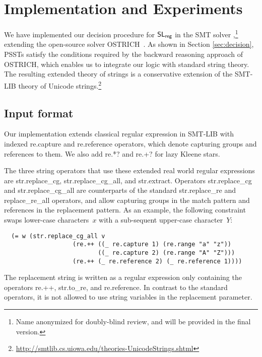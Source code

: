 
\section{Implementation and Experiments}
\label{sect:impl}

We have implemented our decision procedure for $\mathsf{SL}_{\sf reg}$ in the SMT
solver \ostrich,\footnote{Name anonymized for doubly-blind review,
and will be provided in the final version.} extending the
open-source solver OSTRICH~\cite{CHL+19}.
As shown in Section \ref{sec:decision},
PSSTs satisfy the conditions required by the backward reasoning
approach of OSTRICH, which enables us to integrate our logic with
standard string theory. The resulting extended theory of strings is a
conservative extension of the SMT-LIB theory of Unicode
strings.\footnote{\url{http://smtlib.cs.uiowa.edu/theories-UnicodeStrings.shtml}}

\subsection{Input format}

Our implementation extends classical regular expression in SMT-LIB
with indexed {\sf re.capture} and {\sf re.reference} operators, which
denote capturing groups and references to them. We also add {\sf re.*?}
and {\sf re.+?} for lazy Kleene stars.

The three string operators that use these extended real world regular
expressions are {\sf str.replace\_cg}, {\sf str.replace\_cg\_all}, and
{\sf str.extract}. Operators {\sf str.replace\_cg} and {\sf
  str.replace\_cg\_all} are counterparts of the standard {\sf
  str.replace\_re} and {\sf replace\_re\_all} operators, and allow
capturing groups in the match pattern and references in the
replacement pattern. As an example, the following constraint swaps
lower-case characters~$x$ with a sub-sequent upper-case character~$Y$:
%
\begin{verbatim}
  (= w (str.replace_cg_all v
                   (re.++ ((_ re.capture 1) (re.range "a" "z"))
                          ((_ re.capture 2) (re.range "A" "Z")))
                   (re.++ (_ re.reference 2) (_ re.reference 1))))
\end{verbatim}
%
The replacement string is written as a regular expression only
containing the operators {\sf re.++}, {\sf str.to\_re}, and {\sf re.reference}. In contrast to the standard operators, it is not allowed to use string variables in the 
replacement parameter.


